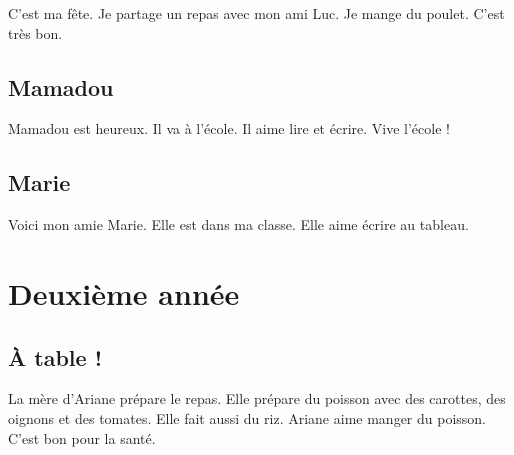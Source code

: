 \documentclass[11pt, french]{article}
\begin{document}
C'est ma fête. Je partage un repas avec mon ami Luc. Je mange du poulet. C'est très bon.

\subsection{Mamadou}

Mamadou est heureux. Il va à l'école. Il aime lire et écrire. Vive l'école !

\subsection{Marie}

Voici mon amie Marie. Elle est dans ma classe. Elle aime écrire au tableau.

\section{Deuxième année}

\subsection{À table !}

La mère d'Ariane prépare le repas. Elle prépare du poisson avec des carottes, des oignons et des tomates. Elle fait aussi du riz. Ariane aime manger du poisson. C'est bon pour la santé.
\end{document}

